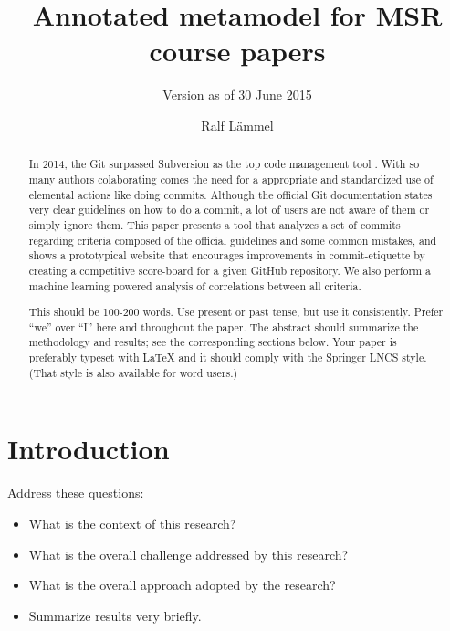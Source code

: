 \documentclass{llncs}
\begin{document}
\title{Annotated metamodel for MSR course papers}

\subtitle{Version as of 30 June 2015}

\author{Ralf L\"ammel}


\maketitle

\begin{abstract}
  In 2014, the Git surpassed Subversion as the top code management tool \cite{EComSurv14}. With so many authors colaborating comes the need for a appropriate and standardized use of elemental actions like doing commits. Although the official Git documentation states very clear guidelines \cite{OffGuide} on how to do a commit, a lot of users are not aware of them or simply ignore them.
  This paper presents a tool that analyzes a set of commits regarding criteria composed of the official guidelines and some common mistakes, and shows a prototypical website that encourages improvements in commit-etiquette by creating a competitive score-board for a given GitHub repository. We also perform a machine learning powered analysis of correlations between all criteria.


  This should be 100-200 words. Use present or past tense, but use it
  consistently. Prefer ``we'' over ``I'' here and throughout the
  paper. The abstract should summarize the methodology and results;
  see the corresponding sections below. Your paper is preferably
  typeset with LaTeX and it should comply with the Springer LNCS
  style. (That style is also available for word users.)
\end{abstract}


\section{Introduction}

Address these questions:

\begin{itemize}

\item What is the context of this research?

\item What is the overall challenge addressed by this research?

\item What is the overall approach adopted by the research?

\item Summarize results very briefly.

\end{itemize}
\end{document}
